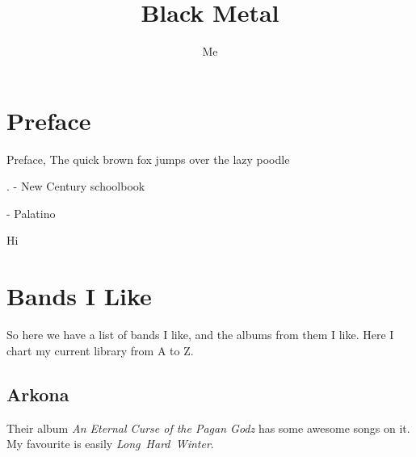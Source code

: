 \documentclass[onecolumn]{article}
\begin{document}
\title{Black Metal}

\predate{}
\postdate{}
\date{}

\author{Me}
\maketitle
\thispagestyle{empty} %


\clearpage{} 

\section*{\centering
Preface} %

Preface, The quick brown fox jumps over the lazy poodle


{\selectfont %
\lipsum[1]. - New Century schoolbook}

{\selectfont  %
\lipsum[1] - Palatino}

\selectfont %
Hi

\clearpage{}
\section*{\centering Bands I Like}
So here we have a list of bands I like, and the albums from them I like. Here I chart my current library from A to Z.

\subsection*{Arkona}
Their album \emph{An Eternal Curse of the Pagan Godz} has some awesome songs on it. My favourite is easily \mbox{\emph{Long Hard Winter}}.
\end{document}
